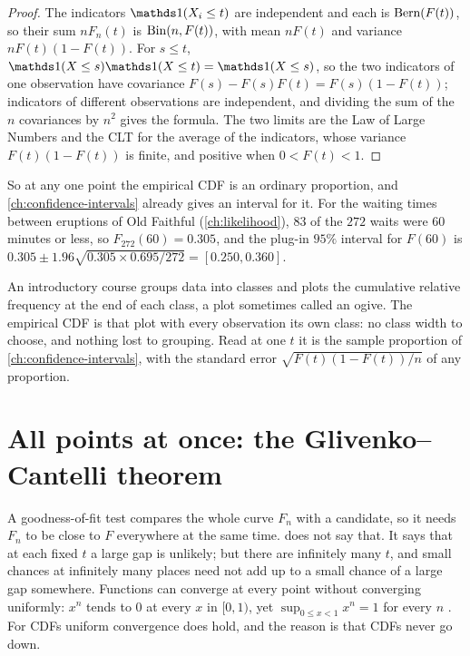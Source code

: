 \begin{proof}
The indicators $\ind(X_i \leq t)$ are independent and each is $\text{Bern}(F(t))$, so their sum $nF_n(t)$ is $\mathrm{Bin}(n, F(t))$, with mean $nF(t)$ and variance $nF(t)(1 - F(t))$.
For $s \leq t$, $\ind(X \leq s)\ind(X \leq t) = \ind(X \leq s)$, so the two indicators of one observation have covariance $F(s) - F(s)F(t) = F(s)(1 - F(t))$; indicators of different observations are independent, and dividing the sum of the $n$ covariances by $n^2$ gives the formula.
The two limits are the Law of Large Numbers and the CLT for the average of the indicators, whose variance $F(t)(1 - F(t))$ is finite, and positive when $0 < F(t) < 1$.
\end{proof}

So at any one point the empirical CDF is an ordinary proportion, and \cref{ch:confidence-intervals} already gives an interval for it.
For the waiting times between eruptions of Old Faithful (\cref{ch:likelihood}), $83$ of the $272$ waits were $60$ minutes or less, so $F_{272}(60) = 0.305$, and the plug-in $95\%$ interval for $F(60)$ is $0.305 \pm 1.96\sqrt{0.305 \times 0.695/272} = [0.250, 0.360]$.

\begin{bridge}
An introductory course groups data into classes and plots the cumulative relative frequency at the end of each class, a plot sometimes called an ogive.
The empirical CDF is that plot with every observation its own class: no class width to choose, and nothing lost to grouping.
Read at one $t$ it is the sample proportion of \cref{ch:confidence-intervals}, with the standard error $\sqrt{F(t)(1 - F(t))/n}$ of any proportion.
\end{bridge}

\section{All points at once: the Glivenko--Cantelli theorem}
\label{sec:ks-gc}

A goodness-of-fit test compares the whole curve $F_n$ with a candidate, so it needs $F_n$ to be close to $F$ everywhere at the same time.
 does not say that.
It says that at each fixed $t$ a large gap is unlikely; but there are infinitely many $t$, and small chances at infinitely many places need not add up to a small chance of a large gap somewhere.
Functions can converge at every point without converging uniformly: $x^n$ tends to $0$ at every $x$ in $[0, 1)$, yet $\sup_{0 \leq x < 1} x^n = 1$ for every $n$ .
For CDFs uniform convergence does hold, and the reason is that CDFs never go down.

